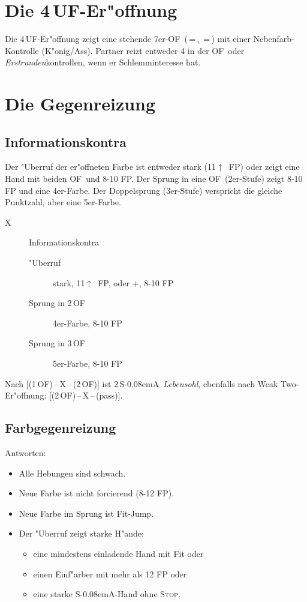 \documentclass[11pt,german,twocolumn]{scrartcl}
\def\pi{\Sp}
\def\co{\He}
\def\ka{\Di}
\def\tr{\Cl}
\def\pl{$\uparrow$}
\def\uf{\nobreak\textsf{\,UF}}
\def\of{\nobreak\textsf{\,OF}}
\def\ofa{\nobreak\textsf{OF}}
\def\sa{\nobreak\textsf{S\kern-0.08emA}}
\def\SA{\nobreak\,\sa}
\def\kontra{\textsf{X}}
\def\sep{\nobreak\,--\,}
\newcommand{\conv}[1]{\emph{#1}}
\def\stp{\textsc{Stop}}
\def\bdsc{\begin{description}}
\def\edsc{\end{description}}
\newcommand{\Index}[1]{#1\index{#1}}
\begin{document}
\section{Die 4\uf-Er"offnung}

Die 4\uf-Er"offnung zeigt eine stehende 7er-\ofa\ (\tr\,=\,\co, \ka\,=\,\pi) mit
einer Nebenfarb-Kontrolle (K"onig/Ass). Partner reizt entweder 4 in der \ofa\
oder \emph{Erstrunden}kontrollen, wenn er Schlemminteresse hat.

\section{Die Gegenreizung}

\subsection{Informationskontra}

Der "Uberruf der er"offneten Farbe ist entweder
stark (11\pl\ FP) oder zeigt eine Hand mit beiden \ofa\ und 8-10 FP. Der Sprung
in eine \ofa\ (2er-Stufe) zeigt 8-10 FP und eine 4er-Farbe. Der Doppelsprung
(3er-Stufe) verspricht die gleiche Punktzahl, aber eine 5er-Farbe.

\bdsc
\item[\kontra] Informationskontra
  \bdsc
  \item["Uberruf] stark, 11\pl\ FP, oder \pi+\co, 8-10 FP
  \item[Sprung in 2\of] 4er-Farbe, 8-10 FP
  \item[Sprung in 3\of] 5er-Farbe, 8-10 FP
  \edsc
\edsc

Nach [(1\of)\sep\kontra\sep(2\of)] ist 2\SA\ \Index{\conv{Lebensohl}}, ebenfalls
nach \Index{Weak Two}-Er"offnung: [(2\of)\sep\kontra\sep(pass)].

\subsection{Farbgegenreizung}

Antworten:

\begin{itemize}
\item Alle Hebungen sind schwach.
\item Neue Farbe ist nicht forcierend (8-12 FP).
\item Neue Farbe im Sprung ist Fit-Jump.
\item Der "Uberruf zeigt starke H"ande:
  \begin{itemize}
  \item eine mindestens einladende Hand mit Fit oder
  \item einen Einf"arber mit mehr als 12 FP oder
  \item eine starke \sa-Hand ohne \stp.
  \end{itemize}
\end{itemize}
\end{document}
